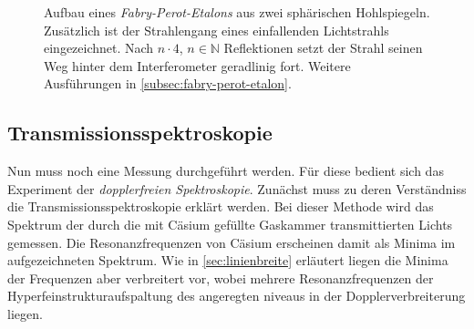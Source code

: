 \documentclass[../bericht.tex]{subfiles}
\begin{document}
        \begin{figure}[ht]
          \caption{Aufbau eines \textit{Fabry-Perot-Etalons} aus zwei sphärischen Hohlspiegeln. Zusätzlich ist der Strahlengang eines einfallenden Lichtstrahls eingezeichnet. Nach $n\cdot 4$, $n\in\mathbb{N}$ Reflektionen setzt der Strahl seinen Weg hinter dem Interferometer geradlinig fort. Weitere Ausführungen in \cref{subsec:fabry-perot-etalon}.}
          \label{fig:fabry-perot-etalon}
        \end{figure}


      \subsection{Transmissionsspektroskopie}
      \label{subsec:transmissionsspektroskopie}

        Nun muss noch eine Messung durchgeführt werden. Für diese bedient sich das Experiment der \textit{dopplerfreien Spektroskopie}. Zun\"achst muss zu deren Verständniss die Transmissionsspektroskopie erklärt werden. Bei dieser Methode wird das Spektrum der durch die mit Cäsium gefüllte Gaskammer transmittierten Lichts gemessen. Die Resonanzfrequenzen von Cäsium erscheinen damit als Minima im aufgezeichneten Spektrum. Wie in \cref{sec:linienbreite} erläutert liegen die Minima der Frequenzen aber verbreitert vor, wobei mehrere Resonanzfrequenzen der Hyperfeinstrukturaufspaltung des angeregten niveaus in der Dopplerverbreiterung liegen.
        \medskip
\end{document}

